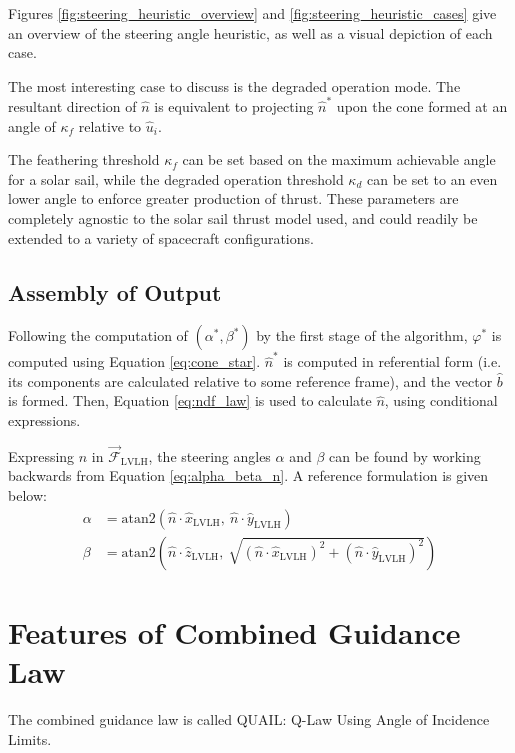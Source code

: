 


Figures \ref{fig:steering_heuristic_overview} and \ref{fig:steering_heuristic_cases} give an overview of the steering angle heuristic, as well as a visual depiction of each case.

The most interesting case to discuss is the degraded operation mode. The resultant direction of $\hat{n}$ is equivalent to projecting $\hat{n}^*$ upon the cone formed at an angle of $\kappa_f$ relative to $\hat{u}_i$.

The feathering threshold $\kappa_f$ can be set based on the maximum achievable angle for a solar sail, while the degraded operation threshold $\kappa_d$ can be set to an even lower angle to enforce greater production of thrust. These parameters are completely agnostic to the solar sail thrust model used, and could readily be extended to a variety of spacecraft configurations.

\subsection{Assembly of Output}
Following the computation of $(\alpha^*, \beta^*)$ by the first stage of the algorithm, $\varphi^*$ is computed using Equation \ref{eq:cone_star}. $\hat{n}^*$ is computed in referential form (i.e. its components are calculated relative to some reference frame), and the vector $\hat{b}$ is formed. Then, Equation \ref{eq:ndf_law} is used to calculate $\hat{n}$, using conditional expressions.

Expressing $\hat{n}$ in $\vec{\mathcal{F}}_{\text{LVLH}}$, the steering angles $\alpha$ and $\beta$ can be found by working backwards from Equation \ref{eq:alpha_beta_n}. A reference formulation is given below:
\begin{align*}
    \alpha &= \mathrm{atan2}\left(\hat{n} \cdot \hat{x}_{\text{LVLH}}, \ \hat{n} \cdot \hat{y}_{\text{LVLH}}\right)\\
    \beta &= \mathrm{atan2}\left(\hat{n} \cdot \hat{z}_{\text{LVLH}}, \ \sqrt{(\hat{n} \cdot \hat{x}_{\text{LVLH}})^2 + (\hat{n} \cdot \hat{y}_{\text{LVLH}})^2}\right)
\end{align*}

\section{Features of Combined Guidance Law}
The combined guidance law is called QUAIL: Q-Law Using Angle of Incidence Limits.



